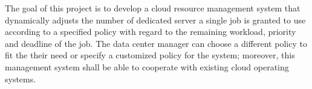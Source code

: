 \documentclass[11pt]{article}
\begin{document}
The goal of this project is to develop a cloud resource management
system that dynamically adjusts the number of dedicated server a single
job is granted to use according to a specified policy with regard to the
remaining workload, priority and deadline of the job. The data center
manager can choose a different policy to fit the their need or specify a
customized policy for the system; moreover, this management system shall
be able to cooperate with existing cloud operating systems.


\renewcommand\refname{Reference}


\end{document}
